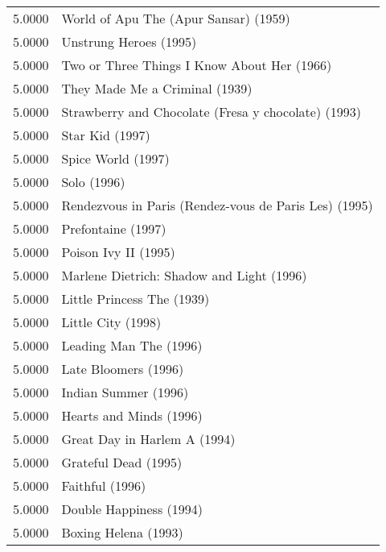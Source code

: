 \begin{flushleft}
\begin{table}[h]
\centering
\setlength{\tabcolsep}{12pt}
\begin{tabular}{|ll|}
\hline
5.0000 & World of Apu The (Apur Sansar) (1959)                 \\
5.0000 & Unstrung Heroes (1995)                                \\
5.0000 & Two or Three Things I Know About Her (1966)           \\
5.0000 & They Made Me a Criminal (1939)                        \\
5.0000 & Strawberry and Chocolate (Fresa y chocolate) (1993)   \\
5.0000 & Star Kid (1997)                                       \\
5.0000 & Spice World (1997)                                    \\
5.0000 & Solo (1996)                                           \\
5.0000 & Rendezvous in Paris (Rendez-vous de Paris Les) (1995) \\
5.0000 & Prefontaine (1997)                                    \\
5.0000 & Poison Ivy II (1995)                                  \\
5.0000 & Marlene Dietrich: Shadow and Light (1996)             \\
5.0000 & Little Princess The (1939)                            \\
5.0000 & Little City (1998)                                    \\
5.0000 & Leading Man The (1996)                                \\
5.0000 & Late Bloomers (1996)                                  \\
5.0000 & Indian Summer (1996)                                  \\
5.0000 & Hearts and Minds (1996)                               \\
5.0000 & Great Day in Harlem A (1994)                          \\
5.0000 & Grateful Dead (1995)                                  \\
5.0000 & Faithful (1996)                                       \\
5.0000 & Double Happiness (1994)                               \\
5.0000 & Boxing Helena (1993)                                  \\

\end{tabular}
\end{table}
\end{flushleft}

